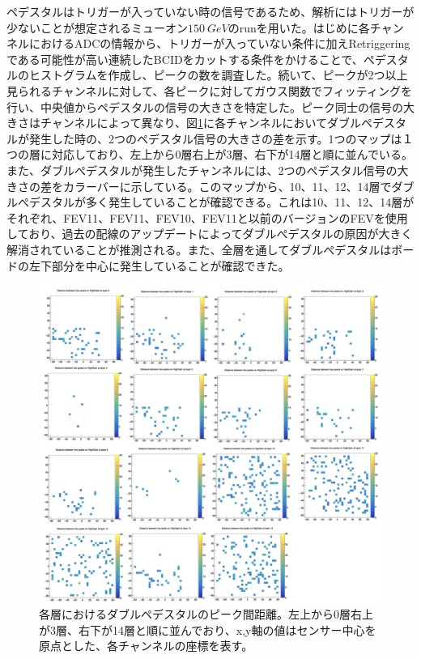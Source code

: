 ペデスタルはトリガーが入っていない時の信号であるため、解析にはトリガーが少ないことが想定されるミューオン$\SI{150}{GeV}$のrunを用いた。はじめに各チャンネルにおけるADCの情報から、トリガーが入っていない条件に加えRetriggeringである可能性が高い連続したBCIDをカットする条件をかけることで、ペデスタルのヒストグラムを作成し、ピークの数を調査した。続いて、ピークが2つ以上見られるチャンネルに対して、各ピークに対してガウス関数でフィッティングを行い、中央値からペデスタルの信号の大きさを特定した。ピーク同士の信号の大きさはチャンネルによって異なり、図\ref{dpmap}に各チャンネルにおいてダブルペデスタルが発生した時の、2つのペデスタル信号の大きさの差を示す。1つのマップは１つの層に対応しており、左上から0層右上が3層、右下が14層と順に並んでいる。また、ダブルぺデスタルが発生したチャンネルには、2つのペデスタル信号の大きさの差をカラーバーに示している。このマップから、10、11、12、14層でダブルぺデスタルが多く発生していることが確認できる。これは10、11、12、14層がそれぞれ、FEV11、FEV11、FEV10、FEV11と以前のバージョンのFEVを使用しており、過去の配線のアップデートによってダブルぺデスタルの原因が大きく解消されていることが推測される。また、全層を通してダブルぺデスタルはボードの左下部分を中心に発生していることが確認できた。

\begin{figure}[H]
\begin{center}
 \includegraphics[keepaspectratio, scale=0.45]
 	{Figure/Beamtest/dpmap.png}
 		\caption[各層におけるダブルペデスタルのピーク間距離]{各層におけるダブルペデスタルのピーク間距離。左上から0層右上が3層、右下が14層と順に並んでおり、x,y軸の値はセンサー中心を原点とした、各チャンネルの座標を表す。}
		\label{dpmap}
\end{center}
\end{figure}

